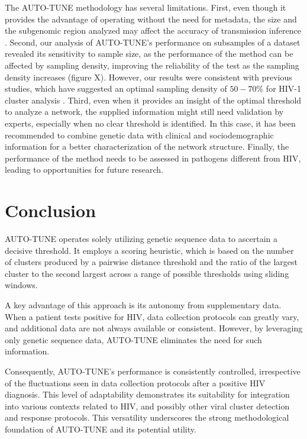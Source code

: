 \documentclass[utf8]{FrontiersinHarvard} %
\begin{document}
The AUTO-TUNE methodology has several limitations. First, even though it
provides the advantage of operating without the need for metadata, the size and
the subgenomic region analyzed may affect the accuracy of transmission
inference \citep{junqueira_factors_2019}. Second, our analysis of AUTO-TUNE's
performance on subsamples of a dataset revealed its sensitivity to sample size,
as the performance of the method can be affected by sampling density, improving
the reliability of the test as the sampling density increases (figure X).
However, our results were consistent with previous studies, which have
suggested an optimal sampling density of $50-70\%$ for HIV-1 cluster analysis
\citep{novitsky_impact_2014}. Third, even when it provides an insight of the
optimal threshold to analyze a network, the supplied information might still
need validation by experts, especially when no clear threshold is identified.
In this case, it has been recommended to combine genetic data with clinical and
sociodemographic information for a better characterization of the network
structure. Finally, the performance of the method needs to be assessed in
pathogens different from HIV, leading to opportunities for future research.

\section{Conclusion}

AUTO-TUNE operates solely utilizing genetic sequence data to ascertain a
decisive threshold. It employs a scoring heuristic, which is based on the
number of clusters produced by a pairwise distance threshold and the ratio of
the largest cluster to the second largest across a range of possible thresholds
using sliding windows.

A key advantage of this approach is its autonomy from supplementary data. When
a patient tests positive for HIV, data collection protocols can greatly vary,
and additional data are not always available or consistent. However, by
leveraging only genetic sequence data, AUTO-TUNE eliminates the need for such
information.

Consequently, AUTO-TUNE's performance is consistently controlled, irrespective
of the fluctuations seen in data collection protocols after a positive HIV
diagnosis. This level of adaptability demonstrates its suitability for
integration into various contexts related to HIV, and possibly other viral
cluster detection and response protocols. This versatility underscores the
strong methodological foundation of AUTO-TUNE and its potential utility.
\end{document}
